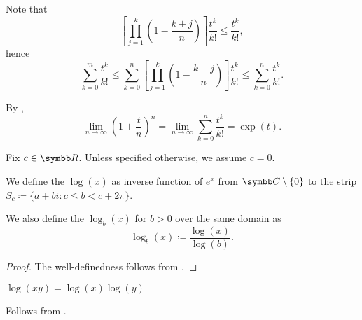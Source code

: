 \begin{RefListProof}
    Note that
    \begin{equation*}
      \left[ \prod_{j=1}^k \left(1 - \frac {k+j} n \right) \right] \frac {t^k} {k!}
      \leq
      \frac {t^k} {k!},
    \end{equation*}
    hence
    \begin{equation*}
      \sum_{k=0}^m \frac {t^k} {k!}
      \leq
      \sum_{k=0}^n \left[ \prod_{j=1}^k \left(1 - \frac {k+j} n \right) \right] \frac {t^k} {k!}
      \leq
      \sum_{k=0}^n \frac {t^k} {k!}.
    \end{equation*}

    By ,
    \begin{equation*}
      \lim_{n \to \infty} \left(1 + \frac t n \right)^n
      =
      \lim_{n \to \infty} \sum_{k=0}^n \frac {t^k} {k!}
      =
      \exp(t).
    \end{equation*}
\end{RefListProof}

\begin{Definition}\label{def:logarithm}
  Fix \( c \in \BR \). Unless specified otherwise, we assume \( c = 0 \).

  We define the  \( \log(x) \) as \hyperref[def:function/inverse]{inverse function} of \( e^x \) from \( \BC \setminus \{ 0 \} \) to the strip \( S_c \coloneqq \{ a + bi \colon c \leq b < c + 2\pi \} \).

  We also define the  \( \log_b(x) \) for \( b > 0 \) over the same domain as
  \begin{equation*}
    \log_b(x) \coloneqq \frac {\log(x)} {\log(b)}.
  \end{equation*}
\end{Definition}
\begin{proof}
  The well-definedness follows from .
\end{proof}

\begin{Proposition}\label{thm:logarithm_properties}
  \mbox{}
  \begin{PropEnum}
     \( \log(xy) = \log(x) \log(y) \)
  \end{PropEnum}
\end{Proposition}
\begin{RefListProof}
     Follows from .
\end{RefListProof}

